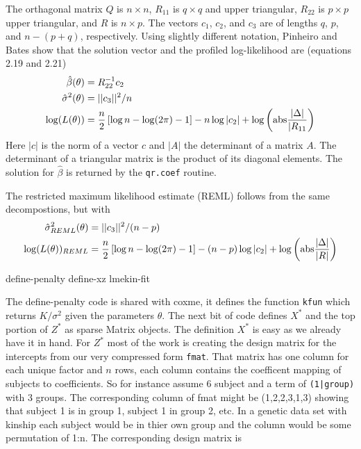 \documentclass{article}
\begin{document}
The orthagonal matrix $Q$ is $n\times n$, $R_{11}$ is $q \times q$ and upper 
triangular, $R_{22}$ is $p \times p$ upper triangular, and $R$ is $n \times p$.
The vectors $c_1$, $c_2$, and $c_3$ are of lengths $q$, $p$, and
$n- (p+q)$, respectively.
Using slightly different notation, Pinheiro and Bates show
that the solution vector and the profiled log-likelihood are (equations 2.19
and 2.21)
\begin{align}
  \hat\beta(\theta) &= R_{22}^{-1} c_2  \label{bhat}\\
  \hat\sigma^2(\theta) &= ||c_3||^2/n  \label{sighat}\\
  \log(L(\theta)) &= \frac{n}{2}\left[ \log n - \log(2\pi) -1 \right] -
    n\log |c_2| + \log\left( {\rm abs} \frac{|\Delta|}{|R_{11}} \right) 
     \label{loghat}
\end{align}
Here $|c|$ is the norm of a vector $c$  and $|A|$ the determinant of a matrix
$A$.  The determinant of a triangular matrix is the product of its
diagonal elements.  The solution for $\hat\beta$ is returned by the
{\tt{}qr.coef} routine.

The restricted maximum likelihood estimate (REML) follows from the same
decompostions, but with
\begin{align}
  \hat\sigma^2_{REML}(\theta) &= ||c_3||^2/(n-p)  \label{sighatREML}\\
  \log(L(\theta))_{REML} &= \frac{n}{2}\left[\log n - \log(2\pi) -1\right] -
    (n-p)\log |c_2| + \log \left( {\rm abs} \frac{|\Delta|}{|R|} \right) 
     \label{loghatREML}
\end{align}


\nwenddocs{}\endmoddef
\LA{}define-penalty\RA{}
\LA{}define-xz\RA{}
\LA{}lmekin-fit\RA{}
\nwendcode{}\nwdocspar

The define-penalty code is shared with coxme, it defines the
function {\tt{}kfun} which returns $K/\sigma^2$ given the parameters $\theta$.
The next bit of code defines $X^*$ and the top portion of $Z^*$
as sparse Matrix objects.
The definition $X^*$ is easy as we already have it in hand.  
For $Z^*$ most of the work is creating the design matrix for the
intercepts from our very compressed form {\tt{}fmat}.
That matrix has one column for each unique factor and $n$ rows,
each column contains the coefficent mapping of subjects to coefficients.
So for instance assume 6 subject and a term of {\tt{}(1|group)} with 3
groups.
The corresponding column of fmat might be (1,2,2,3,1,3) showing that
subject 1 is in group 1, subject 1 in group 2, etc.  
In a genetic data set with kinship each subject would be in thier
own group and the column would be some permutation of 1:n.
The corresponding design matrix is
\end{document}
